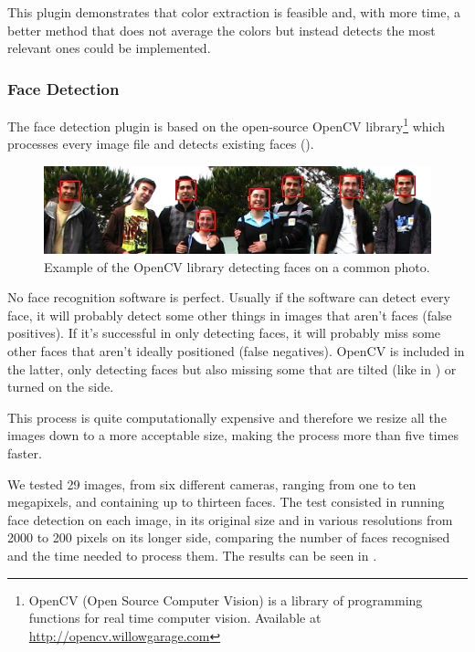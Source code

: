 This plugin demonstrates that color extraction is feasible and, with more time, a better method that does not average the colors but instead detects the most relevant ones could be implemented. 





\subsubsection{Face Detection} %
\label{ssub:face_detection}

The face detection plugin is based on the open-source OpenCV library\footnote{OpenCV (Open Source Computer Vision) is a library of programming functions for real time computer vision. Available at \url{http://opencv.willowgarage.com}} which processes every image file and detects existing faces ().
 
\begin{figure}[ht]
	\centering
		\includegraphics[width=\columnwidth]{Figures/faces1.jpg}
	\caption{Example of the OpenCV library detecting faces on a common photo.}
	\label{fig:faces1}
\end{figure}

No face recognition software is perfect. Usually if the software can detect every face, it will probably detect some other things in images that aren't faces (false positives). If it’s successful in only detecting faces, it will probably miss some other faces that aren't ideally positioned (false negatives). OpenCV is included in the latter, only detecting faces but also missing some that are tilted (like in ) or turned on the side.


This process is quite computationally expensive and therefore we resize all the images down to a more acceptable size, making the process more than five times faster.

We tested 29 images, from six different cameras, ranging from one to ten megapixels, and containing up to thirteen faces. The test consisted in running face detection on each image, in its original size and in various resolutions from 2000 to 200 pixels on its longer side, comparing the number of faces recognised and the time needed to process them. The results can be seen in .

